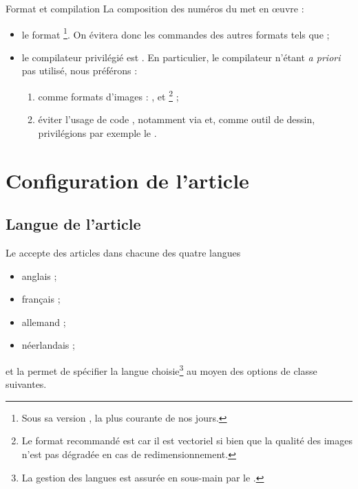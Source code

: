 \begin{dbwarning}{Format et compilation }{}
  La composition des numéros du \nwejm*{} met en œuvre :
  \begin{itemize}
  \item le format \footnote{Sous sa version , la
      plus courante de nos jours.}. On évitera donc les commandes des autres
    formats tels que  ;
  \item le compilateur privilégié est . En particulier, le
    compilateur  n'étant \emph{a priori} pas utilisé, nous
    préférons :
    \begin{enumerate}
    \item comme formats d'images : ,  et
      \footnote{Le format recommandé est  car il est
        vectoriel si bien que la qualité des images n'est pas dégradée en cas de
        redimensionnement.} ;
    \item éviter l'usage de code , notamment via
       et, comme outil de dessin, privilégions par exemple le
      .
    \end{enumerate}
  \end{itemize}
\end{dbwarning}

\section{Configuration de l'article}

\subsection{Langue de l'article}
\label{sec:langue-de-larticle}

Le \nwejm{} accepte des articles dans chacune des quatre langues
\begin{itemize}
\item anglais ;
\item français ;
\item allemand ;
\item néerlandais ;
\end{itemize}
et la \nwejmauthorcl{} permet de spécifier la langue choisie\footnote{La gestion
  des langues est assurée en sous-main par le .} au moyen des
options de classe suivantes.

